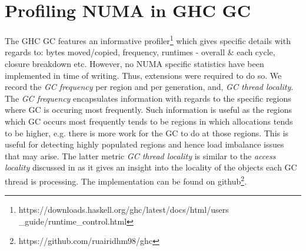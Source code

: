 \documentclass{paper}\usepackage{graphicx}
\begin{document}
\section{Profiling NUMA in GHC GC}
\label{sec:extghc}

The GHC GC features an informative profiler\footnote{https://downloads.haskell.org/ghc/latest/docs/html/users\\\_guide/runtime\_control.html} which gives specific details with regards to: bytes moved/copied, frequency, runtimes - overall \& each cycle, closure breakdown etc. However, no NUMA specific statistics have been implemented in time of writing. Thus, extensions were required to do so. We record the \textit{GC frequency} per region and per generation, and, \textit{GC thread locality}. The \textit{GC frequency} encapsulates information with regards to the specific regions where GC is occuring most frequently. Such information is useful as the regions which GC occurs most frequently tends to be regions in which allocations tends to be higher, e.g. there is more work for the GC to do at those regions. This is useful for detecting highly populated regions and hence load imbalance issues that may arise. The latter metric \textit{GC thread locality} is similar to the \textit{access locality} discussed in  as it gives an insight into the locality of the objects each GC thread is processing. The implementation can be found on github\footnote{https://github.com/ruairidhm98/ghc}.
\end{document}
